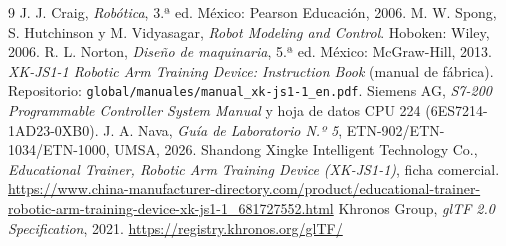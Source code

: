 \documentclass[a4paper,12pt]{article}
\newcommand{\codigo}[1]{\texttt{\small #1}}
\begin{document}
\begin{thebibliography}{9}
 J. J. Craig, \emph{Robótica}, 3.ª ed. México: Pearson Educación, 2006.
 M. W. Spong, S. Hutchinson y M. Vidyasagar, \emph{Robot Modeling and Control}. Hoboken: Wiley, 2006.
 R. L. Norton, \emph{Diseño de maquinaria}, 5.ª ed. México: McGraw-Hill, 2013.
 \emph{XK-JS1-1 Robotic Arm Training Device: Instruction Book} (manual de fábrica). Repositorio: \codigo{global/manuales/manual\_xk-js1-1\_en.pdf}.
 Siemens AG, \emph{S7-200 Programmable Controller System Manual} y hoja de datos CPU 224 (6ES7214-1AD23-0XB0).
 J. A. Nava, \emph{Guía de Laboratorio N.º 5}, ETN-902/ETN-1034/ETN-1000, UMSA, 2026.
 Shandong Xingke Intelligent Technology Co., \emph{Educational Trainer, Robotic Arm Training Device (XK-JS1-1)}, ficha comercial. \url{https://www.china-manufacturer-directory.com/product/educational-trainer-robotic-arm-training-device-xk-js1-1_681727552.html}
 Khronos Group, \emph{glTF 2.0 Specification}, 2021. \url{https://registry.khronos.org/glTF/}
\end{thebibliography}
\end{document}
